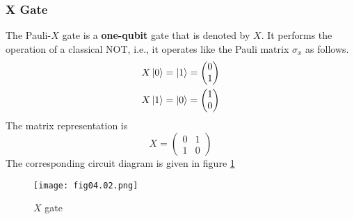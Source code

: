 \subsubsection*{X Gate}
The Pauli-$X$ gate is a \textbf{one-qubit} gate that is denoted by $X$. It performs the operation of a classical NOT, i.e., it operates like the Pauli matrix $\sigma_x$ as follows.
\begin{equation*}
\begin{split}
X\left\vert 0\right\rangle&=\left\vert 1\right\rangle=
\begin{pmatrix}
0\\
1
\end{pmatrix}\\
X\left\vert 1\right\rangle&=\left\vert 0\right\rangle=
\begin{pmatrix}
1\\
0
\end{pmatrix}\\
\end{split}
\end{equation*}
The matrix representation is
\begin{equation*}
X=
\begin{pmatrix}
0&1\\
1&0
\end{pmatrix}
\end{equation*}
The corresponding circuit diagram is given in figure \ref{Fig:4.2}
\begin{figure}[!htb]
   \begin{minipage}{\textwidth}
     \centering
     \texttt{[image: fig04.02.png]}
     \caption{$X$ gate}
     \label{Fig:4.2}
   \end{minipage}
\end{figure}

